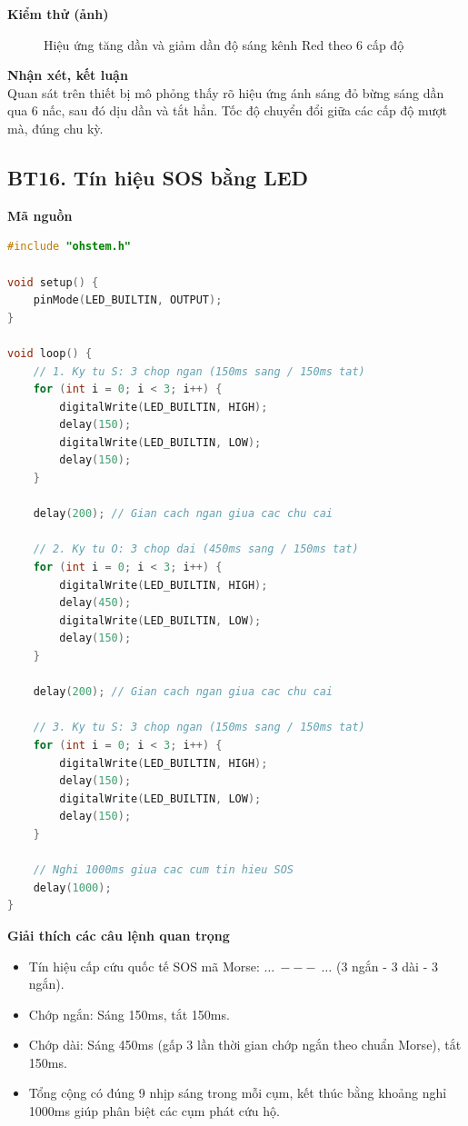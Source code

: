 \noindent\textbf{Kiểm thử (ảnh)}\\
\begin{figure}[H]
    \centering
    \caption{Hiệu ứng tăng dần và giảm dần độ sáng kênh Red theo 6 cấp độ}
    \label{fig:bt15}
\end{figure}

\noindent\textbf{Nhận xét, kết luận}\\
Quan sát trên thiết bị mô phỏng thấy rõ hiệu ứng ánh sáng đỏ bừng sáng dần qua 6 nấc, sau đó dịu dần và tắt hẳn. Tốc độ chuyển đổi giữa các cấp độ mượt mà, đúng chu kỳ.


\subsection*{BT16. Tín hiệu SOS bằng LED}

\noindent\textbf{Mã nguồn}\\
\begin{lstlisting}[language=C]
#include "ohstem.h"

void setup() {
    pinMode(LED_BUILTIN, OUTPUT);
}

void loop() {
    // 1. Ky tu S: 3 chop ngan (150ms sang / 150ms tat)
    for (int i = 0; i < 3; i++) {
        digitalWrite(LED_BUILTIN, HIGH);
        delay(150);
        digitalWrite(LED_BUILTIN, LOW);
        delay(150);
    }

    delay(200); // Gian cach ngan giua cac chu cai

    // 2. Ky tu O: 3 chop dai (450ms sang / 150ms tat)
    for (int i = 0; i < 3; i++) {
        digitalWrite(LED_BUILTIN, HIGH);
        delay(450);
        digitalWrite(LED_BUILTIN, LOW);
        delay(150);
    }

    delay(200); // Gian cach ngan giua cac chu cai

    // 3. Ky tu S: 3 chop ngan (150ms sang / 150ms tat)
    for (int i = 0; i < 3; i++) {
        digitalWrite(LED_BUILTIN, HIGH);
        delay(150);
        digitalWrite(LED_BUILTIN, LOW);
        delay(150);
    }

    // Nghi 1000ms giua cac cum tin hieu SOS
    delay(1000);
}
\end{lstlisting}

\noindent\textbf{Giải thích các câu lệnh quan trọng}\\
\begin{itemize}
    \item Tín hiệu cấp cứu quốc tế SOS mã Morse: $\dots\ ---\ \dots$ (3 ngắn - 3 dài - 3 ngắn).
    \item Chớp ngắn: Sáng 150ms, tắt 150ms.
    \item Chớp dài: Sáng 450ms (gấp 3 lần thời gian chớp ngắn theo chuẩn Morse), tắt 150ms.
    \item Tổng cộng có đúng 9 nhịp sáng trong mỗi cụm, kết thúc bằng khoảng nghỉ 1000ms giúp phân biệt các cụm phát cứu hộ.
\end{itemize}

